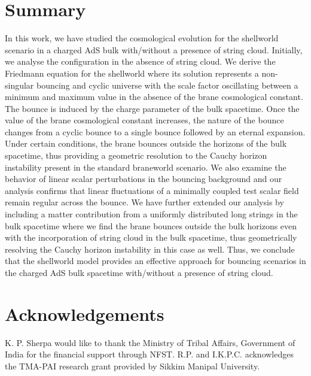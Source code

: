 \documentclass[12pt]{article}
\begin{document}
\section{Summary}\label{sec5}
In this work, we have studied the cosmological evolution for the shellworld scenario in a charged AdS bulk with/without a presence of string cloud. Initially, we analyse the configuration in the absence of string cloud. We derive the Friedmann equation for the shellworld where its solution represents a non-singular bouncing and cyclic universe with the scale factor oscillating between a minimum and maximum value in the absence of the brane cosmological constant. The bounce is induced by the charge parameter of the bulk spacetime. Once the value of the brane cosmological constant increases, the nature of the bounce changes from a cyclic bounce to a single bounce followed by an eternal expansion. Under certain conditions, the brane bounces outside the horizons of the bulk spacetime, thus providing a geometric resolution to the Cauchy horizon instability present in the standard braneworld scenario. We also examine the behavior of linear scalar perturbations in the bouncing background and our analysis confirms that linear fluctuations of a minimally coupled test scalar field remain regular across the bounce. We have further extended our analysis by including a matter contribution from a uniformly distributed long strings in the bulk spacetime where we find the brane bounces outside the bulk horizons even with the incorporation of string cloud in the bulk spacetime, thus geometrically resolving the Cauchy horizon instability in this case as well. Thus, we conclude that the shellworld model provides an effective approach for bouncing scenarios in the charged AdS bulk spacetime with/without a presence of string cloud.

\section*{Acknowledgements}
K. P. Sherpa would like to thank the Ministry of Tribal Affairs, Government of India for the financial support through NFST. R.P. and I.K.P.C. acknowledges the TMA-PAI research grant provided by Sikkim Manipal University.


\printbibliography
\end{document}
